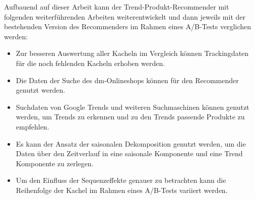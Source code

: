 Aufbauend auf dieser Arbeit kann der Trend-Produkt-Recommender mit folgenden weiterführenden Arbeiten weiterentwickelt und dann jeweils mit der bestehenden Version des Recommenders im Rahmen eines A/B-Tests verglichen werden:

\begin{itemize}
		\item Zur besseren Auswertung aller Kacheln im Vergleich können Trackingdaten für die noch fehlenden Kacheln erhoben werden.
		\item Die Daten der Suche des dm-Onlineshops können für den Recommender genutzt werden.
		\item Suchdaten von Google Trends und weiteren Suchmaschinen können  genutzt werden, um Trends zu erkennen und zu den Trends passende Produkte zu empfehlen.
		\item Es kann der Ansatz der saisonalen Dekomposition genutzt werden, um die Daten über den Zeitverlauf in eine saisonale Komponente und eine Trend Komponente zu zerlegen.
		\item Um den Einfluss der Sequenzeffekte genauer zu betrachten kann die Reihenfolge der Kachel im Rahmen eines A/B-Tests variiert werden.
\end{itemize}

